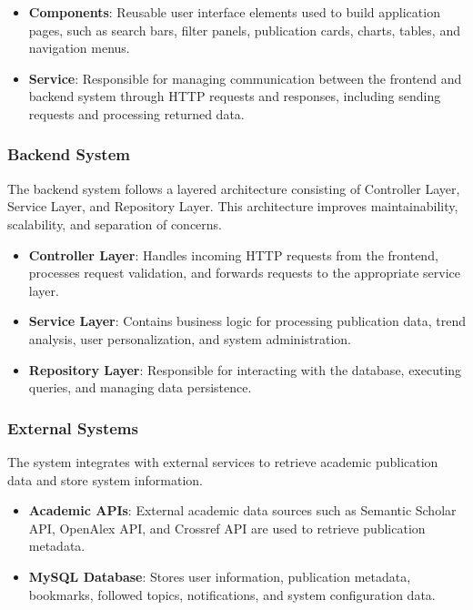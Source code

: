 \documentclass[12pt,a4paper]{article}
\begin{document}
{{\begin{itemize}
	\item \textbf{Components}: Reusable user interface elements used to build application pages, such as search bars, filter panels, publication cards, charts, tables, and navigation menus.
	
	\item \textbf{Service}: Responsible for managing communication between the frontend and backend system through HTTP requests and responses, including sending requests and processing returned data.
\end{itemize}

\subsubsection{Backend System}

The backend system follows a layered architecture consisting of Controller Layer, Service Layer, and Repository Layer. This architecture improves maintainability, scalability, and separation of concerns.

\begin{itemize}
	\item \textbf{Controller Layer}: Handles incoming HTTP requests from the frontend, processes request validation, and forwards requests to the appropriate service layer.
	
	\item \textbf{Service Layer}: Contains business logic for processing publication data, trend analysis, user personalization, and system administration.
	
	\item \textbf{Repository Layer}: Responsible for interacting with the database, executing queries, and managing data persistence.
\end{itemize}

\subsubsection{External Systems}

The system integrates with external services to retrieve academic publication data and store system information.

\begin{itemize}
	\item \textbf{Academic APIs}: External academic data sources such as Semantic Scholar API, OpenAlex API, and Crossref API are used to retrieve publication metadata.
	
	\item \textbf{MySQL Database}: Stores user information, publication metadata, bookmarks, followed topics, notifications, and system configuration data.
\end{itemize}

}}
\end{document}
